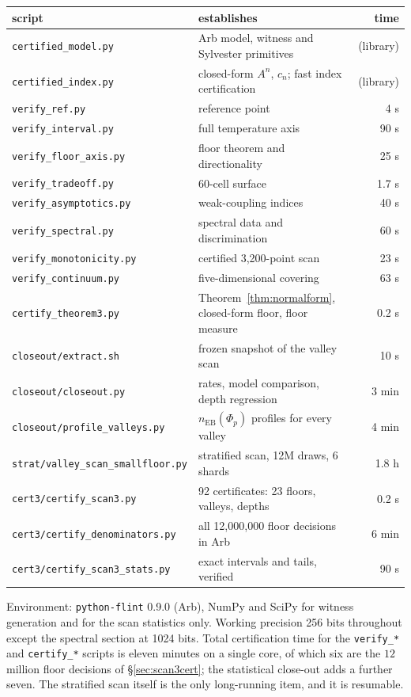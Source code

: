 \documentclass[11pt,a4paper]{article}
\theoremstyle{definition}
\theoremstyle{remark}
\newcommand{\nEB}{n_{\mathrm{EB}}}
\begin{document}
\begin{center}\footnotesize
\begin{tabular}{@{}p{}p{}r@{}}
\toprule
script & establishes & time\\
\midrule
\texttt{certified\_model.py} & Arb model, witness and Sylvester primitives & (library)\\
\texttt{certified\_index.py} & closed-form $A^n$, $c_n$; fast index certification & (library)\\
\texttt{verify\_ref.py} & reference point & 4 s\\
\texttt{verify\_interval.py} & full temperature axis & 90 s\\
\texttt{verify\_floor\_axis.py} & floor theorem and directionality & 25 s\\
\texttt{verify\_tradeoff.py} & 60-cell surface & 1.7 s\\
\texttt{verify\_asymptotics.py} & weak-coupling indices & 40 s\\
\texttt{verify\_spectral.py} & spectral data and discrimination & 60 s\\
\texttt{verify\_monotonicity.py} & certified 3,200-point scan & 23 s\\
\texttt{verify\_continuum.py} & five-dimensional covering & 63 s\\
\texttt{certify\_theorem3.py} & Theorem~\ref{thm:normalform}, closed-form floor, floor measure & 0.2 s\\
\texttt{closeout/extract.sh} & frozen snapshot of the valley scan & 10 s\\
\texttt{closeout/closeout.py} & rates, model comparison, depth regression & 3 min\\
\texttt{closeout/profile\_valleys.py} & $\nEB(\Phi_p)$ profiles for every valley & 4 min\\
\texttt{strat/valley\_scan\_smallfloor.py} & stratified scan, 12M draws, 6 shards & 1.8 h\\
\texttt{cert3/certify\_scan3.py} & 92 certificates: 23 floors, valleys, depths & 0.2 s\\
\texttt{cert3/certify\_denominators.py} & all 12,000,000 floor decisions in Arb & 6 min\\
\texttt{cert3/certify\_scan3\_stats.py} & exact intervals and tails, verified & 90 s\\
\bottomrule
\end{tabular}
\end{center}

\noindent Environment: \texttt{python-flint} 0.9.0 (Arb), NumPy and SciPy for witness generation and for the scan statistics only. Working precision 256 bits throughout except the spectral section at 1024 bits. Total certification time for the \texttt{verify\_*} and \texttt{certify\_*} scripts is eleven minutes on a single core, of which six are the $12$ million floor decisions of \S\ref{sec:scan3cert}; the statistical close-out adds a further seven. The stratified scan itself is the only long-running item, and it is resumable.
\end{document}
